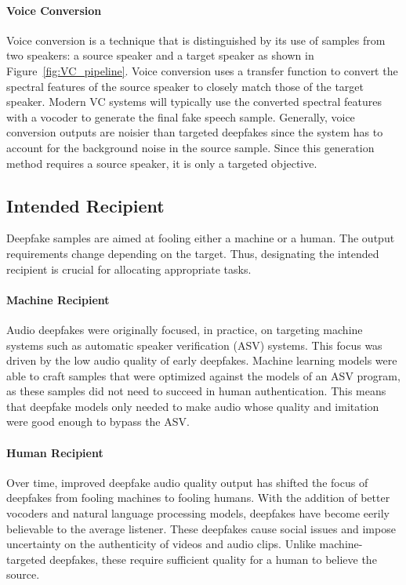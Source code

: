 \documentclass[10pt, journal, anonymous=true]{IEEEtran}
\begin{document}
\paragraph{Voice Conversion}

Voice conversion is a technique that is distinguished by its use of samples
from two speakers: a source speaker and a target speaker as shown in Figure~\ref{fig:VC_pipeline}. Voice conversion uses a transfer function to
convert the spectral features of the source speaker to closely match those of the
target speaker. 
Modern VC systems will typically use the
converted spectral features with a vocoder to generate the final fake speech
sample. 
Generally, voice conversion outputs are noisier than targeted deepfakes
since the system has to account for the background noise in the source sample.
Since this generation method requires a source speaker, it is only a targeted objective. 


\subsection{Intended Recipient}
Deepfake samples are aimed at fooling either a machine or a human. The output 
requirements change depending on the target. Thus, designating the intended recipient is
crucial for allocating appropriate tasks.

\paragraph{Machine Recipient}
Audio deepfakes were originally focused, in practice, on targeting machine systems such as 
automatic speaker verification (ASV) systems. This focus was driven by the
low audio quality of early deepfakes. Machine learning models were
able to craft samples that were optimized against the models of an ASV program, as these 
samples did not need to succeed in human authentication. 
This means that deepfake models only needed to make audio 
whose quality and imitation were good enough to bypass the ASV. 

\paragraph{Human Recipient}
Over time, improved deepfake audio quality output has shifted the focus of deepfakes from fooling machines to fooling humans. With the addition of better vocoders and natural language processing models, deepfakes have become eerily believable to the average listener. These deepfakes cause social issues and impose uncertainty on the authenticity of videos and audio clips. Unlike machine-targeted deepfakes, these require sufficient quality for a human to believe the source.
\end{document}
